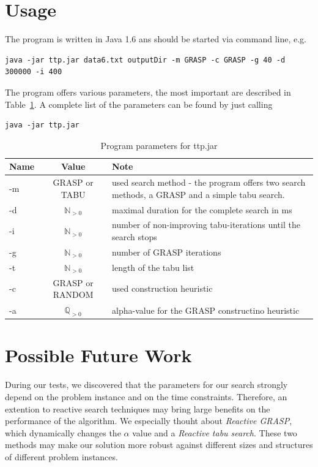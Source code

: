 \documentclass[a4paper,11pt]{article}
\begin{document}
\section{Usage}
The program is written in Java 1.6 ans should be started via command line, e.g.
\small
\lstset{language=sh}
\begin{lstlisting}
java -jar ttp.jar data6.txt outputDir -m GRASP -c GRASP -g 40 -d 300000 -i 400
\end{lstlisting}

The program offers various parameters, the most important are described in Table~\ref{tab:program}. A complete list of the parameters can be found by just calling 
\begin{lstlisting}
java -jar ttp.jar
\end{lstlisting}

\begin{center}
 \begin{table}[htb]
  \begin{tabularx}{\linewidth}{| l | c | X | }
    \hline                       
    Name & Value & Note \\   \hline     \hline    
    -m & GRASP or TABU & used search method - the program offers two search methods, a GRASP and a simple tabu search. \\ \hline    
    -d  & $\mathbb{N}_{ > 0}$ & maximal duration for the complete search in ms \\ \hline    
    -i & $\mathbb{N}_{ > 0}$ & number of non-improving tabu-iterations until the search stops\\ \hline    
    -g & $\mathbb{N}_{ > 0}$ & number of GRASP iterations\\ \hline  
    -t & $\mathbb{N}_{ > 0}$ & length of the tabu list \\ \hline  
    -c & GRASP or RANDOM & used construction heuristic \\ \hline  
    -a & $\mathbb{Q}_{ > 0}$ & alpha-value for the GRASP constructino heuristic \\ \hline  
  \end{tabularx}
    \caption{Program parameters for ttp.jar}
  \label{tab:program}
  \end{table}
\end{center}

\section{Possible Future Work}
During our tests, we discovered that the parameters for our search strongly depend on the problem instance and on the time constraints. Therefore,
an extention to reactive search techniques may bring large benefits on the performance of the algorithm. We especially thouht about \emph{Reactive GRASP},
 which dynamically changes the $\alpha$ value and a \emph{Reactive tabu search}. These two methods may make our solution more robust against different
sizes and structures of different problem instances.
\end{document}
